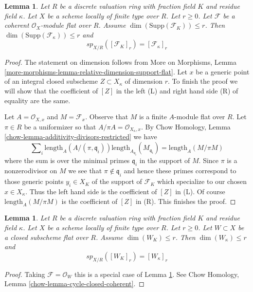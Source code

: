 \documentclass{stacks-project}
\theoremstyle{plain}
\newtheorem{lemma}[subsection]{Lemma}
\theoremstyle{definition}
\theoremstyle{remark}
\numberwithin{equation}{subsection}
\begin{document}
\begin{lemma}
\label{lemma-specialization-module}
Let $R$ be a discrete valuation ring with fraction field $K$ and residue field
$\kappa$. Let $X$ be a scheme locally of finite type over $R$. Let $r \geq 0$.
Let $\mathcal{F}$ be a coherent $\mathcal{O}_X$-module flat over $R$. Assume
$\dim(\text{Supp}(\mathcal{F}_K)) \leq r$. Then
$\dim(\text{Supp}(\mathcal{F}_\kappa)) \leq r$ and
$$
sp_{X/R}([\mathcal{F}_K]_r) = [\mathcal{F}_\kappa]_r
$$
\end{lemma}

\begin{proof}
The statement on dimension follows from More on Morphisms, Lemma
\ref{more-morphisms-lemma-relative-dimension-support-flat}.
Let $x$ be a generic point of an integral closed subscheme
$Z \subset X_\kappa$ of dimension $r$. To finish the proof
we will show that the coefficient of $[Z]$
in the left (L) and right hand side (R) of equality are the same.

\medskip\noindent
Let $A = \mathcal{O}_{X, x}$ and $M = \mathcal{F}_x$.
Observe that $M$ is a finite $A$-module flat over $R$.
Let $\pi \in R$ be a uniformizer so that
$A/\pi A = \mathcal{O}_{X_\kappa, x}$.
By Chow Homology, Lemma \ref{chow-lemma-additivity-divisors-restricted}
we have
$$
\sum\nolimits_i \text{length}_A(A/(\pi, \mathfrak q_i))
\text{length}_{A_{\mathfrak q_i}}(M_{\mathfrak q_i}) =
\text{length}_A(M/\pi M)
$$
where the sum is over the minimal primes
$\mathfrak q_i$ in the support of $M$.
Since $\pi$ is a nonzerodivisor on $M$ we see
that $\pi \not \in \mathfrak q_i$ and hence
these primes correspond to those generic points $y_i \in X_K$ of the
support of $\mathcal{F}_K$ which specialize to our chosen $x \in X_\kappa$.
Thus the left hand side is the coefficient of $[Z]$
in (L). Of course $\text{length}_A(M/\pi M)$ is the coefficient
of $[Z]$ in (R). This finishes the proof.
\end{proof}

\begin{lemma}
\label{lemma-specialization-closed}
Let $R$ be a discrete valuation ring with fraction field $K$ and residue field
$\kappa$. Let $X$ be a scheme locally of finite type over $R$. Let $r \geq 0$.
Let $W \subset X$ be a closed subscheme flat over $R$. Assume
$\dim(W_K) \leq r$. Then $\dim(W_\kappa) \leq r$ and
$$
sp_{X/R}([W_K]_r) = [W_\kappa]_r
$$
\end{lemma}

\begin{proof}
Taking $\mathcal{F} = \mathcal{O}_W$ this is a special case of
Lemma \ref{lemma-specialization-module}. See
Chow Homology, Lemma \ref{chow-lemma-cycle-closed-coherent}.
\end{proof}
\end{document}
